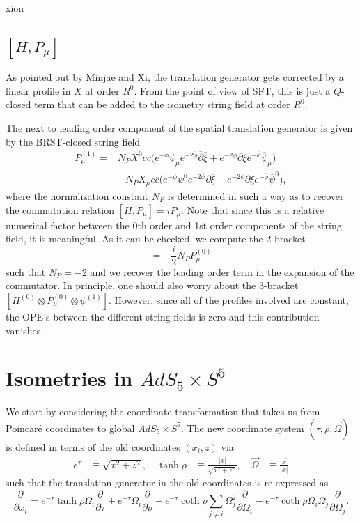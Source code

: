 xion\documentclass[12pt]{article}
\def\be{\begin{equation}}
\def\ee{\end{equation}}
\def\ie{\begin{equation}\begin{aligned}}
\def\fe{\end{aligned}\end{equation}}
\numberwithin{equation}{section}
\newcommand{\B}[1]{\overline{#1}}
\begin{document}
\subsection{$[H,P_{\mu}]$}
As pointed out by Minjae and Xi, the translation generator gets corrected by a linear profile in $X$ at order $R^{0}$. From the point of view of SFT, this is just a $Q$-closed term that can be added to the isometry string field at order $R^{0}$.

The next to leading order component of the spatial translation generator is given by the BRST-closed string field
\be
\begin{split}
    P_{\mu}^{(1)}=&N_PX^0c\B{c}\big(e^{-\phi}\psi_{\mu}e^{-2\B{\phi}}\B{\partial}\B{\xi}+e^{-2\phi}\partial\xi e^{-\B{\phi}}\B{\psi}_{\mu}\big)\\
    &-N_PX_{\mu}c\B{c}\big(e^{-\phi}\psi^0e^{-2\B{\phi}}\B{\partial}\B{\xi}+e^{-2\phi}\partial\xi e^{-\B{\phi}}\B{\psi}^0\big),
\end{split}
\ee
where the normalization constant $N_P$ is determined in such a way as to recover the commutation relation $[H,P_{\mu}]=iP_{\mu}$. Note that since this is a relative numerical factor between the 0th order and 1st order components of the string field, it is meaningful. As it can be checked, we compute the 2-bracket
\be
    [H^{(0)}\otimes P_{\mu}^{(1)}]=-\frac{i}{2}N_PP^{(0)}_{\mu}
\ee
such that $N_P=-2$ and we recover the leading order term in the expansion of the commutator. In principle, one should also worry about the 3-bracket $[H^{(0)}\otimes P_{\mu}^{(0)}\otimes \psi^{(1)}]$. However, since all of the profiles involved are constant, the OPE's between the different string fields is zero and this contribution vanishes.

\section{Isometries in $AdS_5\times S^5$}
We start by considering the coordinate transformation that takes us from Poincaré coordinates to global $AdS_5\times S^5$. The new coordinate system $(\tau,\rho,\vec{\Omega})$ is defined in terms of the old coordinates $(x_i,z)$ via
\ie
    e^{\tau}&\equiv\sqrt{x^2+z^2},\quad
    \tanh{\rho}&\equiv\frac{|x|}{\sqrt{x^2+z^2}},\quad
    \vec{\Omega}&\equiv\frac{\vec{x}}{|x|}
\fe
such that the translation generator in the old coordinates is re-expressed as
\be \label{poincglob}
    \frac{\partial}{\partial x_i}=e^{-\tau}\tanh{\rho}\Omega_i\frac{\partial}{\partial\tau}+e^{-\tau}\Omega_i\frac{\partial}{\partial\rho}+e^{-\tau}\coth{\rho}\sum_{j\neq i}\Omega_j^2\frac{\partial}{\partial \Omega_i}-e^{-\tau}\coth{\rho}\Omega_i\Omega_j\frac{\partial}{\partial\Omega_j}.
\ee
\end{document}
